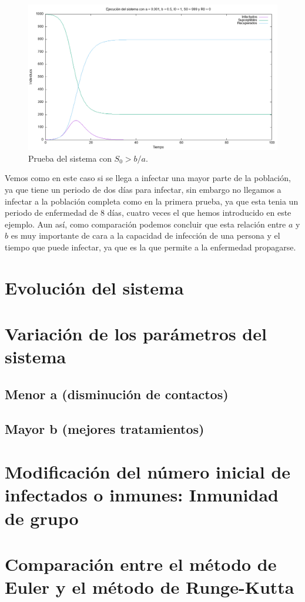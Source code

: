 \documentclass[12pt, spanish]{article}
\begin{document}
\begin{figure}[H]
  \centering
      \includegraphics[width=\textwidth]{SIR_s0_mayor.png}
 		\caption{Prueba del sistema con $S_0 > b/a$.}
\end{figure}

Vemos como en este caso si se llega a infectar una mayor parte de la población, ya que tiene un periodo de dos días para infectar, sin embargo no llegamos a infectar a la población completa como en la primera prueba, ya que esta tenia un periodo de enfermedad de 8 días, cuatro veces el que hemos introducido en este ejemplo. Aun así, como comparación podemos concluir que esta relación entre $a$ y $b$ es muy importante de cara a la capacidad de infección de una persona y el tiempo que puede infectar, ya que es la que permite a la enfermedad propagarse.




\section{Evolución del sistema}


\section{Variación de los parámetros del sistema}

\subsection{Menor a (disminución de contactos)}

\subsection{Mayor b (mejores tratamientos)}



\section{Modificación del número inicial de infectados o inmunes: Inmunidad de grupo}

\section{Comparación entre el método de Euler y el método de Runge-Kutta}


%
%
\end{document}

